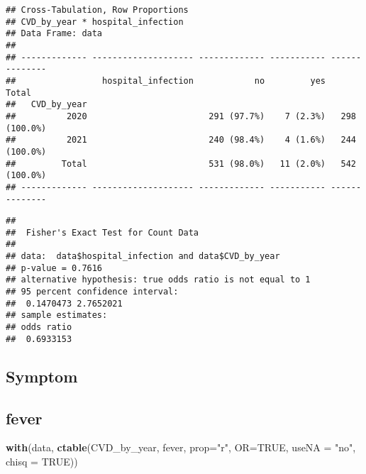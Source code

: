 \documentclass[
]{article}
\newenvironment{Shaded}{\begin{snugshade}}{\end{snugshade}}
\newcommand{\AttributeTok}[1]{\textcolor[rgb]{0.13,0.29,0.53}{#1}}
\newcommand{\ConstantTok}[1]{\textcolor[rgb]{0.56,0.35,0.01}{#1}}
\newcommand{\FunctionTok}[1]{\textcolor[rgb]{0.13,0.29,0.53}{\textbf{#1}}}
\newcommand{\NormalTok}[1]{#1}
\newcommand{\SpecialCharTok}[1]{\textcolor[rgb]{0.81,0.36,0.00}{\textbf{#1}}}
\newcommand{\StringTok}[1]{\textcolor[rgb]{0.31,0.60,0.02}{#1}}
\begin{document}
\begin{verbatim}
## Cross-Tabulation, Row Proportions  
## CVD_by_year * hospital_infection  
## Data Frame: data  
## 
## ------------- -------------------- ------------- ----------- --------------
##                 hospital_infection            no         yes          Total
##   CVD_by_year                                                              
##          2020                        291 (97.7%)    7 (2.3%)   298 (100.0%)
##          2021                        240 (98.4%)    4 (1.6%)   244 (100.0%)
##         Total                        531 (98.0%)   11 (2.0%)   542 (100.0%)
## ------------- -------------------- ------------- ----------- --------------
\end{verbatim}

\begin{Shaded}
\end{Shaded}

\begin{verbatim}
## 
##  Fisher's Exact Test for Count Data
## 
## data:  data$hospital_infection and data$CVD_by_year
## p-value = 0.7616
## alternative hypothesis: true odds ratio is not equal to 1
## 95 percent confidence interval:
##  0.1470473 2.7652021
## sample estimates:
## odds ratio 
##  0.6933153
\end{verbatim}

\hypertarget{symptom}{%
\subsection{Symptom}\label{symptom}}

\hypertarget{fever}{%
\subsection{fever}\label{fever}}

\begin{Shaded}
\begin{Highlighting}[]
\FunctionTok{with}\NormalTok{(data, }\FunctionTok{ctable}\NormalTok{(CVD\_by\_year, fever, }\AttributeTok{prop=}\StringTok{"r"}\NormalTok{, }\AttributeTok{OR=}\ConstantTok{TRUE}\NormalTok{, }\AttributeTok{useNA =} \StringTok{"no"}\NormalTok{, }\AttributeTok{chisq =} \ConstantTok{TRUE}\NormalTok{))}
\end{Highlighting}
\end{Shaded}
\end{document}
